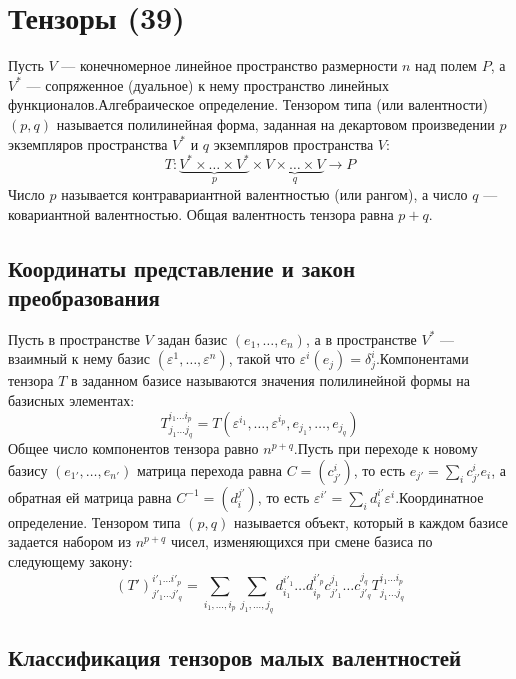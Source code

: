 \documentclass[14pt]{extreport}
\begin{document}
    \chapter{Тензоры (39)}
    \begin{defbox}
        Пусть $V$ — конечномерное линейное пространство размерности $n$ над полем $P$, а $V^*$ — сопряженное (дуальное) к нему пространство линейных функционалов.Алгебраическое определение. Тензором типа (или валентности) $(p, q)$ называется полилинейная форма, заданная на декартовом произведении $p$ экземпляров пространства $V^*$ и $q$ экземпляров пространства $V$:$$T: \underbrace{V^* \times \dots \times V^*}_{p} \times \underbrace{V \times \dots \times V}_{q} \to P$$Число $p$ называется контравариантной валентностью (или рангом), а число $q$ — ковариантной валентностью. Общая валентность тензора равна $p + q$.
    \end{defbox}

    \section{Координаты представление и закон преобразования}

    Пусть в пространстве $V$ задан базис $(e_1, \dots, e_n)$, а в пространстве $V^*$ — взаимный к нему базис $(\varepsilon^1, \dots, \varepsilon^n)$, такой что $\varepsilon^i(e_j) = \delta_j^i$.Компонентами тензора $T$ в заданном базисе называются значения полилинейной формы на базисных элементах:$$T^{i_1 \dots i_p}_{j_1 \dots j_q} = T(\varepsilon^{i_1}, \dots, \varepsilon^{i_p}, e_{j_1}, \dots, e_{j_q})$$Общее число компонентов тензора равно $n^{p+q}$.Пусть при переходе к новому базису $(e_{1'}, \dots, e_{n'})$ матрица перехода равна $C = (c_{j'}^i)$, то есть $e_{j'} = \sum_{i} c_{j'}^i e_i$, а обратная ей матрица равна $C^{-1} = (d_i^{j'})$, то есть $\varepsilon^{i'} = \sum_{i} d_i^{i'} \varepsilon^i$.Координатное определение. Тензором типа $(p, q)$ называется объект, который в каждом базисе задается набором из $n^{p+q}$ чисел, изменяющихся при смене базиса по следующему закону:$$(T')^{i'_1 \dots i'_p}_{j'_1 \dots j'_q} = \sum_{i_1, \dots, i_p} \sum_{j_1, \dots, j_q} d_{i_1}^{i'_1} \dots d_{i_p}^{i'_p} c_{j'_1}^{j_1} \dots c_{j'_q}^{j_q} T^{i_1 \dots i_p}_{j_1 \dots j_q}$$

    \section{Классификация тензоров малых валентностей}
\end{document}

